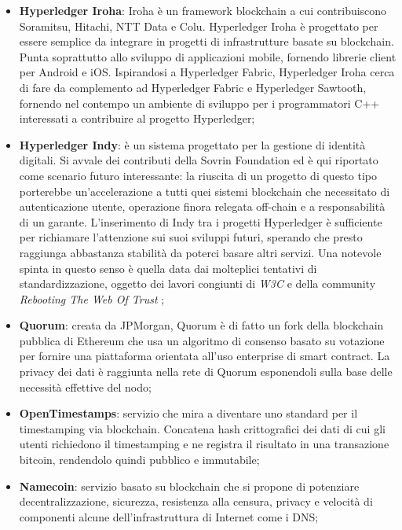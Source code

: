 \begin{itemize}
            \item \textbf{Hyperledger Iroha}: Iroha è un framework blockchain a cui contribuiscono Soramitsu, Hitachi, NTT Data e Colu. Hyperledger Iroha è progettato per essere semplice da integrare in progetti di infrastrutture basate su blockchain. Punta soprattutto allo sviluppo di applicazioni mobile, fornendo librerie client per Android e iOS. Ispirandosi a Hyperledger Fabric, Hyperledger Iroha cerca di fare da complemento ad Hyperledger Fabric e Hyperledger Sawtooth, fornendo nel contempo un ambiente di sviluppo per i programmatori C++ interessati a contribuire al progetto Hyperledger;

            \item \textbf{Hyperledger Indy}: è un sistema progettato per la gestione di identità digitali. Si avvale dei contributi della Sovrin Foundation ed è qui riportato come scenario futuro interessante: la riuscita di un progetto di questo tipo porterebbe un'accelerazione a tutti quei sistemi blockchain che necessitato di autenticazione utente, operazione finora relegata off-chain e a responsabilità di un garante. L'inserimento di Indy tra i progetti Hyperledger è sufficiente per richiamare l'attenzione sui suoi sviluppi futuri, sperando che presto raggiunga abbastanza stabilità da poterci basare altri servizi. Una notevole spinta in questo senso è quella data dai molteplici tentativi di standardizzazione, oggetto dei lavori congiunti di \emph{W3C} e della community \emph{Rebooting The Web Of Trust} \cite{rebooting_web_of_trust};

            \item \textbf{Quorum}: creata da JPMorgan, Quorum è di fatto un fork della blockchain pubblica di Ethereum che usa un algoritmo di consenso basato su votazione per fornire una piattaforma orientata all'uso enterprise di smart contract. La privacy dei dati è raggiunta nella rete di Quorum esponendoli sulla base delle necessità effettive del nodo;

            \item \textbf{OpenTimestamps}: servizio che mira a diventare uno standard per il timestamping via blockchain. Concatena hash crittografici dei dati di cui gli utenti richiedono il timestamping e ne registra il risultato in una transazione bitcoin, rendendolo quindi pubblico e immutabile;

            \item \textbf{Namecoin}: servizio basato su blockchain che si propone di potenziare decentralizzazione, sicurezza, resistenza alla censura, privacy e velocità di componenti alcune dell'infrastruttura di Internet come i DNS;


\end{itemize}
